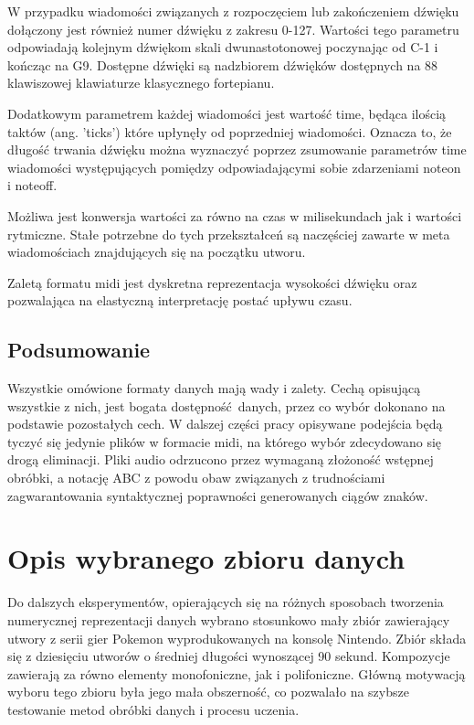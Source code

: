 {{{            W przypadku wiadomości związanych z rozpoczęciem lub zakończeniem
            dźwięku dołączony jest również numer dźwięku z zakresu 0-127. 
            Wartości tego parametru odpowiadają kolejnym dźwiękom skali dwunastotonowej poczynając od C-1 i kończąc na G9.
            Dostępne dźwięki są nadzbiorem dźwięków dostępnych na 88 klawiszowej klawiaturze klasycznego fortepianu.

            Dodatkowym parametrem każdej wiadomości jest wartość time, będąca ilością taktów (ang. 'ticks') które upłynęły
            od poprzedniej wiadomości. Oznacza to, że długość trwania dźwięku można wyznaczyć poprzez zsumowanie parametrów time
            wiadomości występujących pomiędzy odpowiadającymi sobie zdarzeniami note\textunderscore on i note\textunderscore off.

            Możliwa jest konwersja wartości za równo na czas w milisekundach jak i wartości rytmiczne.
            Stałe potrzebne do tych przekształceń są naczęściej zawarte w meta wiadomościach znajdujących się na początku utworu.

            Zaletą formatu midi jest dyskretna reprezentacja wysokości dźwięku oraz pozwalająca na elastyczną 
            interpretację postać upływu czasu.
        }

        \subsection{Podsumowanie}
        {
            Wszystkie omówione formaty danych mają wady i zalety. Cechą opisującą wszystkie z nich, jest 
            bogata dostępność danych, przez co wybór dokonano na podstawie pozostałych cech.
            W dalszej części pracy opisywane podejścia będą tyczyć się jedynie plików w formacie midi, na którego 
            wybór zdecydowano się drogą eliminacji. Pliki audio odrzucono przez wymaganą złożoność wstępnej obróbki,
            a notację ABC z powodu obaw związanych z trudnościami zagwarantowania syntaktycznej poprawności 
            generowanych ciągów znaków.
        }
    }

    \section{Opis wybranego zbioru danych}
    {
        Do dalszych eksperymentów, opierających się na różnych sposobach tworzenia numerycznej reprezentacji
        danych wybrano stosunkowo mały zbiór zawierający utwory z serii gier Pokemon wyprodukowanych na konsolę Nintendo.
        Zbiór składa się z dziesięciu utworów o średniej długości wynoszącej 90 sekund. Kompozycje zawierają za równo 
        elementy monofoniczne, jak i polifoniczne. Główną motywacją wyboru tego zbioru była jego mała obszerność,
        co pozwalało na szybsze testowanie metod obróbki danych i procesu uczenia.
    }
}